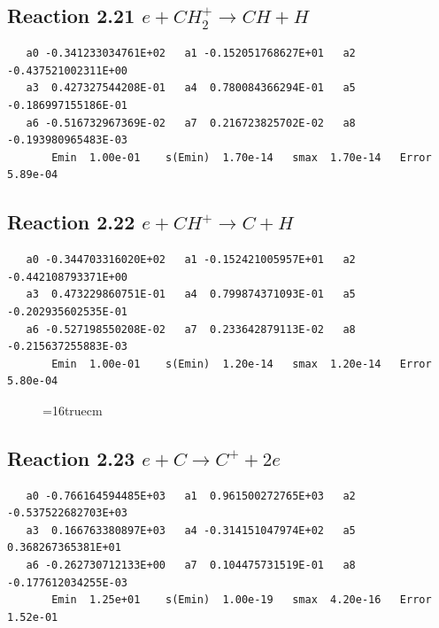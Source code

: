 \documentclass[12pt,dvipdfmx]{article}
\begin{document}
\subsection{
Reaction 2.21     $e + CH_2^+ \rightarrow CH + H $
}

\begin{small}\begin{verbatim}
   a0 -0.341233034761E+02   a1 -0.152051768627E+01   a2 -0.437521002311E+00
   a3  0.427327544208E-01   a4  0.780084366294E-01   a5 -0.186997155186E-01
   a6 -0.516732967369E-02   a7  0.216723825702E-02   a8 -0.193980965483E-03
       Emin  1.00e-01    s(Emin)  1.70e-14   smax  1.70e-14   Error  5.89e-04
\end{verbatim}\end{small}

\subsection{
Reaction 2.22     $e + CH^+ \rightarrow C + H $
}

\begin{small}\begin{verbatim}
   a0 -0.344703316020E+02   a1 -0.152421005957E+01   a2 -0.442108793371E+00
   a3  0.473229860751E-01   a4  0.799874371093E-01   a5 -0.202935602535E-01
   a6 -0.527198550208E-02   a7  0.233642879113E-02   a8 -0.215637255883E-03
       Emin  1.00e-01    s(Emin)  1.20e-14   smax  1.20e-14   Error  5.80e-04
\end{verbatim}\end{small}

\begin{figure} \label{met.1_2.20}
\epsfxsize=16truecm
\end{figure}
\newpage

\subsection{
Reaction 2.23     $e + C \rightarrow C^+ + 2e $
}

\begin{small}\begin{verbatim}
   a0 -0.766164594485E+03   a1  0.961500272765E+03   a2 -0.537522682703E+03
   a3  0.166763380897E+03   a4 -0.314151047974E+02   a5  0.368267365381E+01
   a6 -0.262730712133E+00   a7  0.104475731519E-01   a8 -0.177612034255E-03
       Emin  1.25e+01    s(Emin)  1.00e-19   smax  4.20e-16   Error  1.52e-01
\end{verbatim}\end{small}
\end{document}

